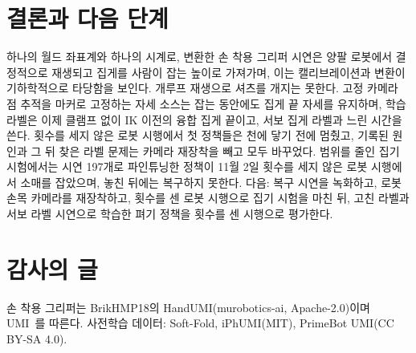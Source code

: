 \documentclass[conference,10pt]{IEEEtran}
\begin{document}
\section{결론과 다음 단계}\label{sec:next}
하나의 월드 좌표계와 하나의 시계로, 변환한 손 착용 그리퍼 시연은 양팔 로봇에서 결정적으로 재생되고 집게를 사람이 잡는 높이로
가져가며, 이는 캘리브레이션과 변환이 기하학적으로 타당함을 보인다. 개루프 재생으로 셔츠를 개지는 못한다. 고정 카메라 점 추적을
마커로 고정하는 자세 소스는 잡는 동안에도 집게 끝 자세를 유지하며, 학습 라벨은 이제 클램프 없이 IK 이전의 융합 집게 끝이고,
서보 집게 라벨과 느린 시간을 쓴다. 횟수를 세지 않은 로봇 시행에서 첫 정책들은 천에 닿기 전에 멈췄고, 기록된 원인과 그 뒤 찾은 라벨
문제는 카메라 재장착을 빼고 모두 바꾸었다. 범위를 줄인 집기 시험에서는 시연 197개로 파인튜닝한 정책이 11월 2일 횟수를 세지 않은
로봇 시행에서 소매를 잡았으며, 놓친 뒤에는 복구하지 못한다. 다음: 복구 시연을 녹화하고, 로봇 손목 카메라를 재장착하고, 횟수를 센 로봇 시행으로 집기 시험을 마친 뒤, 고친
라벨과 서보 라벨 시연으로 학습한 펴기 정책을 횟수를 센 시행으로 평가한다.

\section*{감사의 글}
손 착용 그리퍼는 BrikHMP18의 HandUMI(murobotics-ai, Apache-2.0)이며 UMI~\cite{chi2024umi}를 따른다. 사전학습 데이터: Soft-Fold,
iPhUMI(MIT), PrimeBot UMI(CC BY-SA 4.0).
\end{document}
